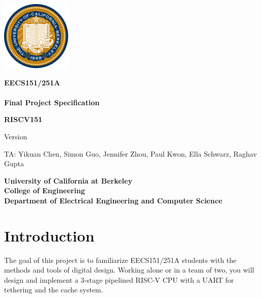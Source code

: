 \documentclass[11pt]{article}
\begin{document}
\clearpage
\thispagestyle{empty}

\begin{center}
\includegraphics[width=0.25\textwidth]{images/Seal_of_University_of_California_Berkeley.png}
\end{center}
\begin{center}
\LARGE{
\color{gray}
\bf EECS151/251A \\
\currentSemester\\
Final Project Specification\\
}
\end{center}

\vfill


\begin{center}
\color{berkeleyblue}
\Huge
{\bf RISCV151 }  \\
\end{center}

\vfill

\begin{center}
\LARGE{
\color{gray}
Version \projectSpecVersion\\}
\end{center}

\vspace{3mm}

\begin{center}
\large{
TA: Yikuan Chen, Simon Guo, Jennifer Zhou, Paul Kwon, Ella Schwarz, Raghav Gupta}
\end{center}

\begin{center}
\large{
\bf
University of California at Berkeley \\
College of Engineering \\
Department of Electrical Engineering and Computer Science \\
}
\end{center}

\newpage
{}
\tableofcontents

\newpage

\section{Introduction}
The goal of this project is to familiarize EECS151/251A students with the methods and tools of digital design.
Working alone or in a team of two, you will design and implement a 3-stage pipelined RISC-V CPU with a UART for tethering and the cache system.
\end{document}
